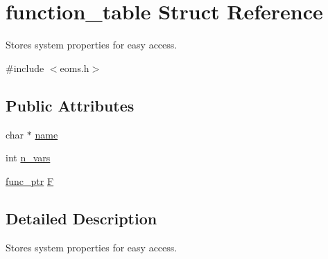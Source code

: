 \hypertarget{structfunction__table}{\section{function\-\_\-table Struct Reference}
\label{structfunction__table}
}


Stores system properties for easy access.  




{\ttfamily \#include $<$eoms.\-h$>$}

\subsection*{Public Attributes}
\begin{DoxyCompactItemize}
\item 
char $\ast$ \hyperlink{structfunction__table_a99650448c98f34476adf6caf60a22df2}{name}
\item 
int \hyperlink{structfunction__table_ae4e3f9023fbce759fc423e921e51d43f}{n\-\_\-vars}
\item 
\hyperlink{eoms_8h_a0fc6dd7956511b847ec24dbdd9ac87ac}{func\-\_\-ptr} \hyperlink{structfunction__table_a9788c2e52edde5a8e37d1e7b4ea6b234}{F}
\end{DoxyCompactItemize}


\subsection{Detailed Description}
Stores system properties for easy access. 

